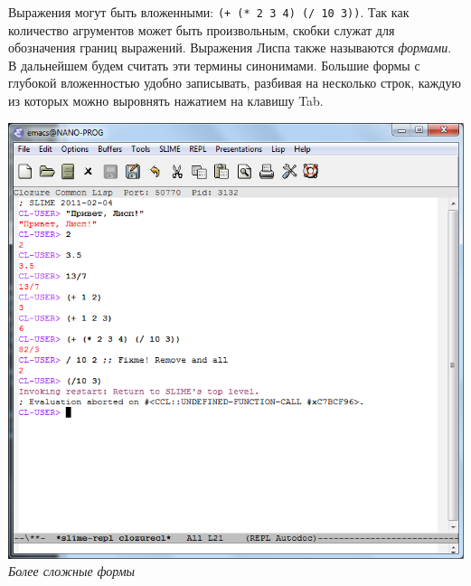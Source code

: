 \documentclass[a4paper, 12pt, titlepage, twoside]{article}
\begin{document}
Выражения могут быть вложенными: \verb|(+ (* 2 3 4) (/ 10 3))|. Так как количество агрументов может быть произвольным, скобки служат для обозначения границ выражений. Выражения Лиспа также называются \textit{формами}. В дальнейшем будем считать эти термины синонимами. %
Большие формы с глубокой вложенностью удобно записывать, разбивая на несколько строк, каждую из которых можно выровнять нажатием на клавишу Tab.
\begin{center}
  \includegraphics[scale=.7]{lispbox_more_complex}\\ %
  \small{\textit{Более сложные формы}}
\end{center}
\end{document}
